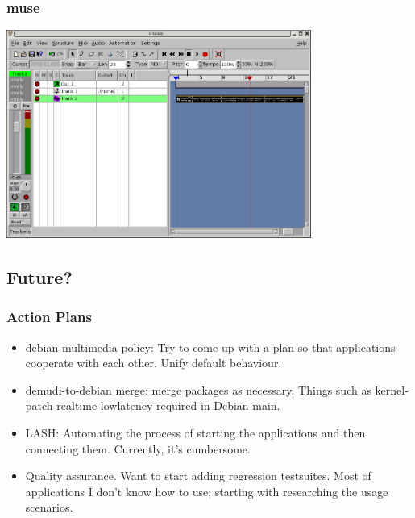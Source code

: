\documentclass[dvipdfmx]{beamer}
\begin{document}
\begin{frame}
 \frametitle{muse}
\includegraphics[width=10cm]{image200602/muse.png}
\end{frame}

 \subsection{Future?}
\begin{frame}
 \frametitle{Action Plans}
\begin{itemize}
 \item debian-multimedia-policy: Try to come up with a plan so that
       applications cooperate with each other. Unify default behaviour.
 \item demudi-to-debian merge: merge packages as necessary.
       Things such as kernel-patch-realtime-lowlatency required in
       Debian main.
 \item LASH: Automating the process of starting the applications and
       then connecting them. Currently, it's cumbersome.
 \item Quality assurance. 
       Want to start adding regression testsuites.
       Most of applications I don't know how to use; starting with researching
       the usage scenarios.
\end{itemize}

\end{frame}
\end{document}

